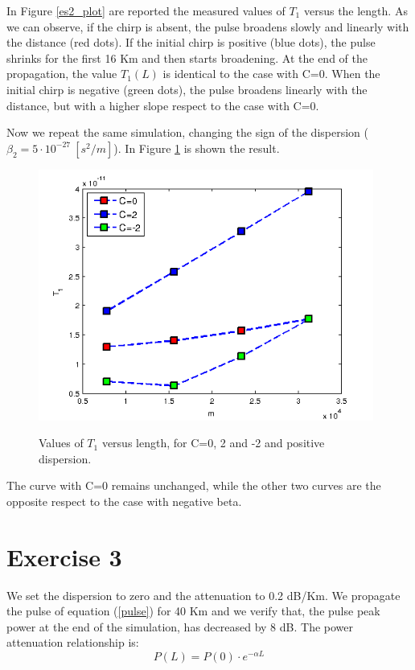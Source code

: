 \documentclass[a4paper,10pt]{report}
\begin{document}
\newpage
In Figure \ref{es2_plot} are reported the measured values of $T_1$ versus the length.
As we can observe, if the chirp is absent, the pulse broadens slowly and linearly with the distance (red dots).
If the initial chirp is positive (blue dots), the pulse shrinks for the first 16 Km and then starts broadening. At the end of the propagation,
the value $T_1(L)$ is identical to the case with C=0. 
When the initial chirp is negative (green dots), the pulse broadens linearly with the distance, but with a higher slope respect to the case with C=0.

Now we repeat the same simulation, changing the sign of the dispersion ($\beta_2 = 5 \cdot 10^{-27} \ [s^2/m]$).
In Figure \ref{es2_plot2} is shown the result.
\begin{figure}[!ht]
  \centering
  \includegraphics[width=11cm]{es2_plot2.png}\\
  \caption{Values of $T_1$ versus length, for C=0, 2 and -2 and positive dispersion.}
  \label{es2_plot2}
\end{figure}
The curve with C=0 remains unchanged, while the other two curves are the opposite respect to the case with negative beta.

\newpage
\section*{Exercise 3}
We set the dispersion to zero and the attenuation to 0.2 dB/Km.
We propagate the pulse of equation (\ref{pulse}) for 40 Km and we verify that, the pulse peak power at the end
of the simulation, has decreased by 8 dB.
The power attenuation relationship is: 
$$P(L)=P(0) \cdot e^{-\alpha L}$$
\end{document}
